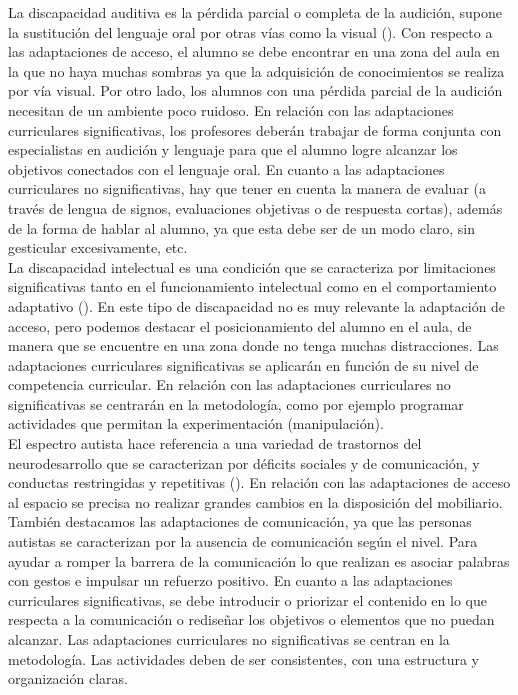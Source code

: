 La discapacidad auditiva es la pérdida parcial o completa de la audición, supone la sustitución del lenguaje oral por otras vías como la visual (\citeauthor{disAuditiva}). Con respecto a las adaptaciones de acceso, el alumno se debe encontrar en una zona del aula en la que no haya muchas sombras ya que la adquisición de conocimientos se realiza por vía visual. Por otro lado, los alumnos con una pérdida parcial de la audición necesitan de un ambiente poco ruidoso. En relación con las adaptaciones curriculares significativas, los profesores deberán trabajar de forma conjunta con especialistas en audición y lenguaje para que el alumno logre alcanzar los objetivos conectados con el lenguaje oral. En cuanto a las adaptaciones curriculares no significativas, hay que tener en cuenta la manera de evaluar (a través de lengua de signos, evaluaciones objetivas o de respuesta cortas), además de la forma de hablar al alumno, ya que esta debe ser de un modo claro, sin gesticular excesivamente, etc.
\\

La discapacidad intelectual es una condición que se caracteriza por limitaciones significativas tanto en el funcionamiento intelectual como en el comportamiento adaptativo (\citeauthor{disIntelectual}). En este tipo de discapacidad no es muy relevante la adaptación de acceso, pero podemos destacar el posicionamiento del alumno en el aula, de manera que se encuentre en una zona donde no tenga muchas distracciones. Las adaptaciones curriculares significativas se aplicarán en función de su nivel de competencia curricular. En relación con las adaptaciones curriculares no significativas se centrarán en la metodología, como por ejemplo programar actividades que permitan la experimentación (manipulación).
\\

El espectro autista hace referencia a una variedad de trastornos del neurodesarrollo que se caracterizan por déficits sociales y de comunicación, y conductas restringidas y repetitivas (\citeauthor{espectroAutista}). En relación con las adaptaciones de acceso al espacio se precisa no realizar grandes cambios en la disposición del mobiliario. También destacamos las adaptaciones de comunicación, ya que las personas autistas se caracterizan por la ausencia de comunicación según el nivel. Para ayudar a romper la barrera de la comunicación lo que realizan es asociar palabras con gestos e impulsar un refuerzo positivo. En cuanto a las adaptaciones curriculares significativas, se debe introducir o priorizar el contenido en lo que respecta a la  comunicación o rediseñar los objetivos o elementos que no puedan alcanzar. Las adaptaciones curriculares no significativas se centran en la metodología. Las actividades deben de ser consistentes, con una estructura y organización claras.
\\

